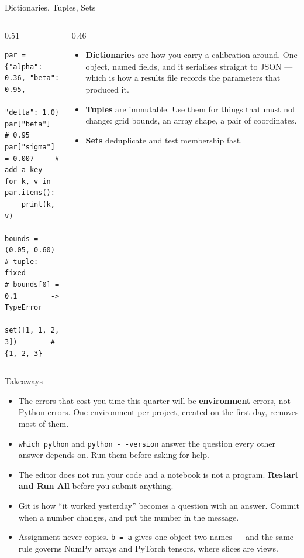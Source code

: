 \begin{frame}[fragile]{Dictionaries, Tuples, Sets}
\begin{columns}[T]
\begin{column}{0.51\textwidth}
\begin{lstlisting}
par = {"alpha": 0.36, "beta": 0.95,
       "delta": 1.0}
par["beta"]              # 0.95
par["sigma"] = 0.007     # add a key
for k, v in par.items():
    print(k, v)

bounds = (0.05, 0.60)    # tuple: fixed
# bounds[0] = 0.1        -> TypeError

set([1, 1, 2, 3])        # {1, 2, 3}
\end{lstlisting}
\end{column}
\begin{column}{0.46\textwidth}
\small
\begin{itemize}\footnotesize
  \item \textbf{Dictionaries} are how you carry a calibration around. One object, named fields, and it serialises straight to JSON --- which is how a results file records the parameters that produced it.
  \item \textbf{Tuples} are immutable. Use them for things that must not change: grid bounds, an array shape, a pair of coordinates.
  \item \textbf{Sets} deduplicate and test membership fast.
\end{itemize}
\end{column}
\end{columns}
\vspace{1mm}
\end{frame}

\begin{frame}{Takeaways}
\begin{takeawaybox}
\begin{itemize}\small
  \item The errors that cost you time this quarter will be \textbf{environment} errors, not Python errors. One environment per project, created on the first day, removes most of them.
  \item \texttt{which python} and \texttt{python -\,-version} answer the question every other answer depends on. Run them before asking for help.
  \item The editor does not run your code and a notebook is not a program. \textbf{Restart and Run All} before you submit anything.
  \item Git is how ``it worked yesterday'' becomes a question with an answer. Commit when a number changes, and put the number in the message.
  \item Assignment never copies. \texttt{b = a} gives one object two names --- and the same rule governs NumPy arrays and PyTorch tensors, where slices are views.
\end{itemize}
\end{takeawaybox}
\end{frame}

